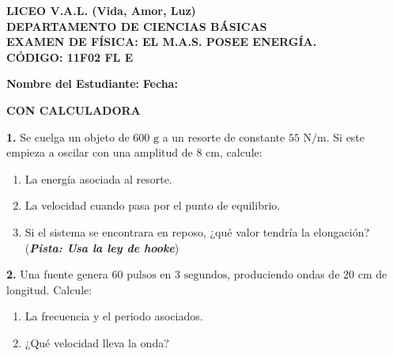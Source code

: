 \documentclass[11pt, letterpaper]{article}
\begin{document}
	
	\begin{center}
		{\Large \textbf{LICEO V.A.L. (Vida, Amor, Luz)}}\\[0.1cm]
		{\large \textbf{DEPARTAMENTO DE CIENCIAS BÁSICAS}}\\[0.1cm]
		{\large \textbf{EXAMEN DE FÍSICA: EL M.A.S. POSEE ENERGÍA.}}\\[0.1cm]
		\hfill \textbf{CÓDIGO: 11F02 FL E}
	\end{center}
	
	\vspace{0.3cm}
	\noindent \textbf{Nombre del Estudiante:} \underline{\hspace{8.5cm}} \textbf{Fecha:} \underline{\hspace{3cm}}
	
	\vspace{0.2cm}
	\hfill \textbf{CON CALCULADORA}
	\vspace{0.6cm}
	
	\noindent \textbf{1.} Se cuelga un objeto de $600\text{ g}$ a un resorte de constante $55\text{ N/m}$. Si este empieza a oscilar con una amplitud de $8\text{ cm}$, calcule:
	\begin{enumerate}[label=\alph*), itemsep=0cm, leftmargin=0.8cm]
		\item La energía asociada al resorte.
		\item La velocidad cuando pasa por el punto de equilibrio.
		\item Si el sistema se encontrara en reposo, ¿qué valor tendría la elongación?(\textbf{\textit{Pista: Usa la ley de hooke}})
	\end{enumerate}
	
	
	\noindent \textbf{2.} Una fuente genera $60\text{ pulsos}$ en $3\text{ segundos}$, produciendo ondas de $20\text{ cm}$ de longitud. Calcule:
	\begin{enumerate}[label=\alph*), itemsep=0cm, leftmargin=0.8cm]
		\item La frecuencia y el periodo asociados.
		\item ¿Qué velocidad lleva la onda?
	\end{enumerate}
	
	
\end{document}
